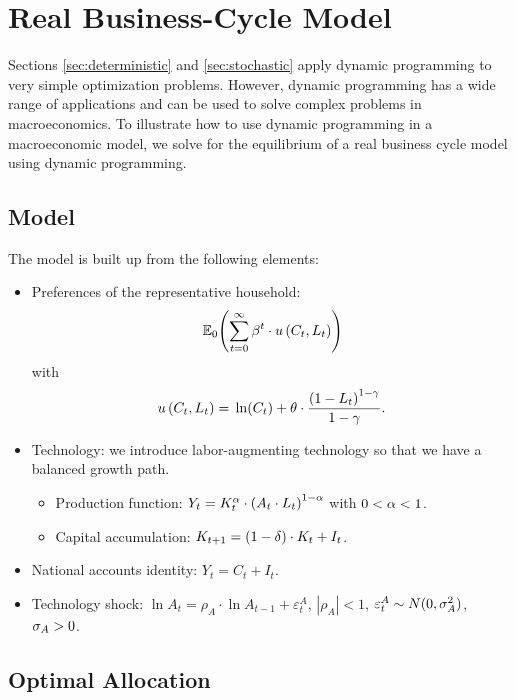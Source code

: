 \documentclass[letterpaper,12pt,leqno]{article}
\begin{document}
\section{Real Business-Cycle Model}

Sections \ref{sec:deterministic} and \ref{sec:stochastic} apply dynamic programming to very simple optimization problems. However, dynamic programming has a wide range of applications and can be used to solve complex problems in macroeconomics. To illustrate how to use dynamic programming in a macroeconomic model, we solve for the equilibrium of a real business cycle model using dynamic programming.

\subsection{Model}

The model is built up from the following elements:

\begin{itemize}
\item Preferences of the representative household: \[\E[0]{\sum_{t=0}^{\infty}\b^t \cdot u\bp{C_{t},L_{t}}
}\]with \[u\bp{C_{t},L_{t}} =\ln{C_{t}}  +\t \cdot \frac{\bp{1-L_{t}}^{1-\g}}{1-\g}.\]
\item Technology: we introduce labor-augmenting technology so that we have a balanced growth path.
\begin{itemize}
\item Production function: $Y_{t}=K_{t}^{\alpha} \cdot \left( A_{t} \cdot L_{t} \right)^{1-\alpha}$ with $0<\alpha<1$.
\item Capital accumulation: $K_{t+1}=\left( 1-\delta \right)\cdot K_{t}+I_{t}$.
\end{itemize}
\item National accounts identity: $Y_{t} =C_{t}+I_{t}$.
\item Technology shock: $\ln A_{t} =\rho_{A}\cdot \ln A_{t-1} +\varepsilon^{A}_{t}$, $|\rho_{A}|<1$, $\varepsilon^{A}_{t}\sim N(0,\sigma_{A}^{2})$, $\sigma_{A}>0$.
\end{itemize}

\subsection{Optimal Allocation}
\end{document}

